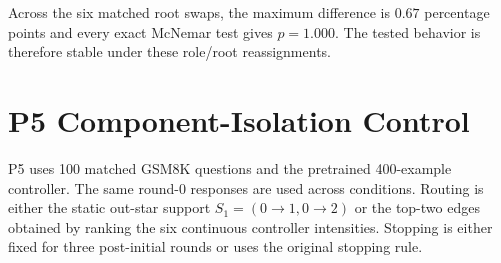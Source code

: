 \documentclass[11pt]{article}
\begin{document}
\begin{table}[H]
\centering
\small
\setlength{\tabcolsep}{3pt}
\caption{Role/root controls on 150 matched GSM8K questions. Root swaps are
within fixed role assignments; $\Delta_{0-2}$ is root-0 minus root-2 accuracy.}
\label{tab:rolecontrol}
\end{table}

Across the six matched root swaps, the maximum difference is $0.67$ percentage
points and every exact McNemar test gives $p=1.000$. The tested behavior is
therefore stable under these role/root reassignments.

\section{P5 Component-Isolation Control}
\label{app:p5}

P5 uses 100 matched GSM8K questions and the pretrained 400-example controller.
The same round-0 responses are used across conditions. Routing is either the
static out-star support $S_1=(0\!\to\!1,0\!\to\!2)$ or the top-two edges obtained
by ranking the six continuous controller intensities. Stopping is either fixed
for three post-initial rounds or uses the original stopping rule.
\end{document}
